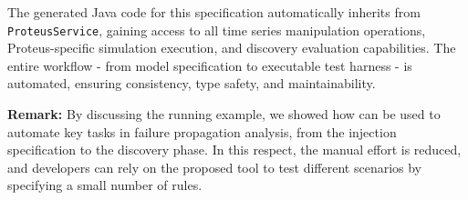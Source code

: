 






The generated Java code for this specification automatically inherits from \texttt{ProteusService}, gaining access to all time series manipulation operations, Proteus-specific simulation execution, and discovery evaluation capabilities. The entire workflow - from model specification to executable test harness - is automated, ensuring consistency, type safety, and maintainability.

\textbf{Remark:} By discussing the running example, we showed how \tool can be used to automate key tasks in failure propagation analysis, from the injection specification to the discovery phase. In this respect, the manual effort is reduced, and developers can rely on the proposed tool to test different scenarios by specifying a small number of rules. 


